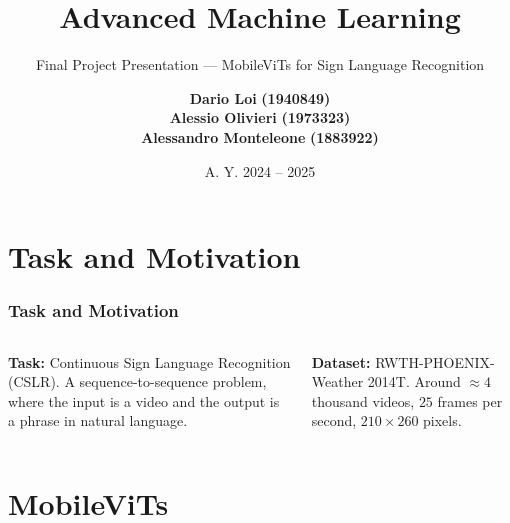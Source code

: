 \documentclass[english, xcolor={table}]{beamer}
\author{\scriptsize \textbf{Dario Loi}  \textbf{(1940849)} \\ \textbf{Alessio Olivieri} \textbf{(1973323)} \\ \textbf{Alessandro Monteleone} \textbf{(1883922)}}
\title{Advanced Machine Learning}
\subtitle{Final Project Presentation --- MobileViTs for Sign Language Recognition}
\institute{M.Sc. in Computer Science, \\ Sapienza, University of Rome.}
\date{A. Y. 2024 -- 2025}
\begin{document}
\maketitle

\section{Task and Motivation}

\begin{frame}
  \frametitle{Task and Motivation}

  \begin{columns}
    \begin{column}{0.5\textwidth}
        \textbf{Task:} Continuous Sign Language Recognition (CSLR).
        A \alert{sequence-to-sequence} problem, where the input is a video and the output is a phrase in natural language.
    \end{column}
    \begin{column}{0.5\textwidth}
        \textbf{Dataset:} RWTH-PHOENIX-Weather 2014T.
        Around $\approx 4$ thousand videos, $25$ frames per second, $210 \times 260$ pixels.
      \end{column}
  \end{columns}
\end{frame}

\section{MobileViTs}
\end{document}

